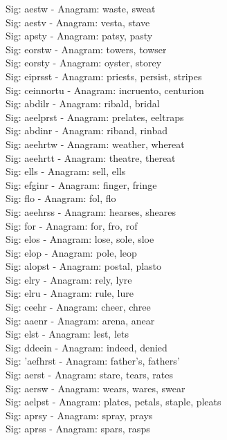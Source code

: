 Sig: {aestw} - Anagram: waste, sweat \\
Sig: {aestv} - Anagram: vesta, stave \\
Sig: {apsty} - Anagram: patsy, pasty \\
Sig: {eorstw} - Anagram: towers, towser \\
Sig: {eorsty} - Anagram: oyster, storey \\
Sig: {eiprsst} - Anagram: priests, persist, stripes \\
Sig: {ceinnortu} - Anagram: incruento, centurion \\
Sig: {abdilr} - Anagram: ribald, bridal \\
Sig: {aeelprst} - Anagram: prelates, eeltraps \\
Sig: {abdinr} - Anagram: riband, rinbad \\
Sig: {aeehrtw} - Anagram: weather, whereat \\
Sig: {aeehrtt} - Anagram: theatre, thereat \\
Sig: {ells} - Anagram: sell, ells \\
Sig: {efginr} - Anagram: finger, fringe \\
Sig: {flo} - Anagram: fol, flo \\
Sig: {aeehrss} - Anagram: hearses, sheares \\
Sig: {for} - Anagram: for, fro, rof \\
Sig: {elos} - Anagram: lose, sole, sloe \\
Sig: {elop} - Anagram: pole, leop \\
Sig: {alopst} - Anagram: postal, plasto \\
Sig: {elry} - Anagram: rely, lyre \\
Sig: {elru} - Anagram: rule, lure \\
Sig: {ceehr} - Anagram: cheer, chree \\
Sig: {aaenr} - Anagram: arena, anear \\
Sig: {elst} - Anagram: lest, lets \\
Sig: {ddeein} - Anagram: indeed, denied \\
Sig: {'aefhrst} - Anagram: father's, fathers' \\
Sig: {aerst} - Anagram: stare, tears, rates \\
Sig: {aersw} - Anagram: wears, wares, swear \\
Sig: {aelpst} - Anagram: plates, petals, staple, pleats \\
Sig: {aprsy} - Anagram: spray, prays \\
Sig: {aprss} - Anagram: spars, rasps \\
